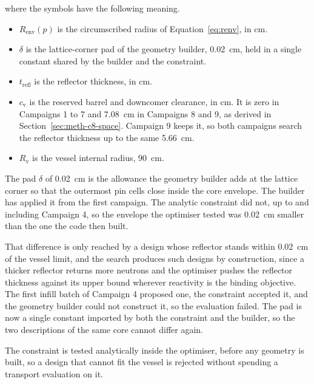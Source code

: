 \noindent where the symbols have the following meaning.

\begin{itemize}
  \item $R_\mathrm{env}(p)$ is the circumscribed radius of
        Equation~\eqref{eq:renv}, in cm.

  \item $\delta$ is the lattice-corner pad of the geometry builder,
        \SI{0.02}{cm}, held in a single constant shared by the builder
        and the constraint.

  \item $t_\mathrm{refl}$ is the reflector thickness, in cm.

  \item $c_\mathrm{v}$ is the reserved barrel and downcomer clearance,
        in cm. It is zero in Campaigns 1 to 7 and \SI{7.08}{cm} in
        Campaigns 8 and 9, as derived in
        Section~\ref{sec:meth-c8-space}. Campaign 9 keeps it, so both
        campaigns search the reflector thickness up to the same
        \SI{5.66}{cm}.

  \item $R_\mathrm{v}$ is the vessel internal radius, \SI{90}{cm}.
\end{itemize}

The pad $\delta$ of \SI{0.02}{cm} is the allowance the geometry builder
adds at the lattice corner so that the outermost pin cells close inside
the core envelope. The builder has applied it from the first campaign.
The analytic constraint did not, up to and including Campaign 4, so the
envelope the optimiser tested was \SI{0.02}{cm} smaller than the one the
code then built.

That difference is only reached by a design whose reflector stands
within \SI{0.02}{cm} of the vessel limit, and the search produces such
designs by construction, since a thicker reflector returns more neutrons
and the optimiser pushes the reflector thickness against its upper bound
wherever reactivity is the binding objective. The first infill batch of
Campaign 4 proposed one, the constraint accepted it, and the geometry
builder could not construct it, so the evaluation failed. The pad is now
a single constant imported by both the constraint and the builder, so
the two descriptions of the same core cannot differ again.

The constraint is tested analytically inside the optimiser, before any
geometry is built, so a design that cannot fit the vessel is rejected
without spending a transport evaluation on it.

